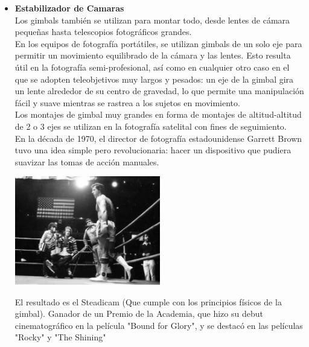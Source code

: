 \begin{itemize}
	\item \textbf{Estabilizador de Camaras}\\
	      Los gimbals también se utilizan para montar todo, desde lentes de cámara pequeñas
	      hasta telescopios fotográficos grandes.\\
	      En los equipos de fotografía portátiles, se utilizan gimbals de un
	      solo eje para permitir un movimiento equilibrado de la cámara y las lentes.
	      Esto resulta útil en la fotografía semi-profesional, así como en cualquier otro
	      caso en el que se adopten teleobjetivos muy largos y pesados: un eje de la gimbal
	      gira un lente alrededor de su centro de gravedad, lo que permite una manipulación
	      fácil y suave mientras se rastrea a los sujetos en movimiento.\\
	      Los montajes de gimbal muy grandes en forma de montajes de altitud-altitud de 2 o 3 ejes
	      se utilizan en la fotografía satelital con fines de seguimiento.\\
	      En la década de 1970, el director de fotografía estadounidense Garrett Brown tuvo
	      una idea simple pero revolucionaria: hacer un dispositivo que pudiera suavizar las
	      tomas de acción manuales.
	      \begin{center}
		      \includegraphics[width=0.5\textwidth]{Contenido/Cuerpo/Capitulo1/Fig4.eps}
		      \label{fig:Introduccion:Fig5}
	      \end{center}

	      El resultado es el Steadicam (Que cumple con los principios físicos de la gimbal).
	      Ganador de un Premio de la Academia, que hizo su debut cinematográfico en la
	      película "Bound for Glory", y se destacó en las películas "Rocky" y "The Shining"


\end{itemize}

